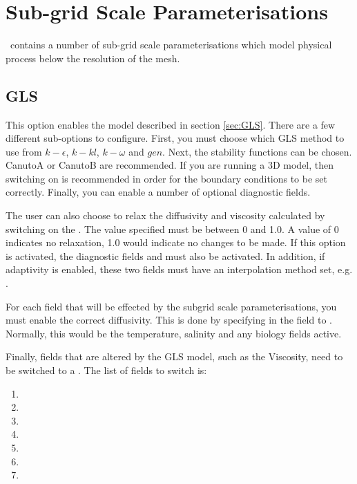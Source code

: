 \section{Sub-grid Scale Parameterisations}
\label{sec:sub-grid-scale-parameterisations}

\fluidity\ contains a number of sub-grid scale parameterisations which model physical process below the resolution of the mesh.

\subsection{GLS}

This option enables the model described in section \ref{sec:GLS}. There are a few different 
sub-options to configure. First, you must choose which GLS method to use 
from $k-\epsilon$, $k-kl$, $k-\omega$ and $gen$. Next, the stability functions
can be chosen. CanutoA or CanutoB are recommended. If you are running a 3D model, then switching on  
 is recommended in order for the boundary conditions to be set correctly. 
Finally, you can enable a number of optional diagnostic fields.

The user can also choose to relax the diffusivity and viscosity calculated by switching on the\linebreak
{}. The value specified must be between 0 and 1.0. A value of 0 indicates
no relaxation, 1.0 would indicate no changes to be made. If this option is activated, the diagnostic fields
 and  must also
be activated. In addition, if adaptivity is enabled, these two fields must have an interpolation
method set, e.g. .

For each field that will be effected by the subgrid scale parameterisations, 
you must enable the correct diffusivity. This
is done by specifying  in the
field to . Normally, this would be the temperature, salinity and any biology fields active.

Finally, fields that are altered by the GLS model, such as the Viscosity, need to be switched
to a . The list of fields to switch is:
\begin{enumerate}
\item {}
\item {}
\item {}
\item {}
\item {}
\item {}
\item {}
\end{enumerate}

